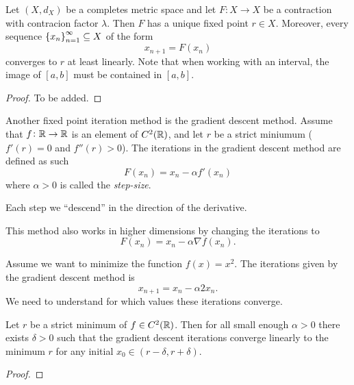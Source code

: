 \documentclass[11pt,a4paper]{article}
\begin{document}
\begin{theorem}
  Let $(X,d_X)$ be a completes metric space and
  let $F \colon X \to X$ be a contraction with contracion factor $\lambda$.
  Then $F$ has a unique fixed point $r \in X$.
  Moreover, every sequence $\left\{x_n\right\}_{n=1}^{\infty} \subseteq X$ of the
  form
  \[
    x_{n+1} = F(x_n)
  \]
  converges to $r$ at least linearly.
  Note that when working with an interval, the image of $[a,b]$ must
  be contained in $[a,b]$.
\end{theorem}
\begin{proof}
  To be added.
\end{proof}


\begin{example}
  Another fixed point iteration method is the gradient descent method.
  Assume that $f \colon \mathbb{R} \to \mathbb{R}$ is an element of $C^2(\mathbb{R})$,
  and let $r$ be a strict miniumum ($f'(r) = 0$ and $f''(r) > 0$).
  The iterations in the gradient descent method are defined as such
  \[
    F(x_n) = x_n - \alpha f'(x_n)
  \]
  where $\alpha > 0$ is called the \textit{step-size}.
\end{example}
\begin{remark}
  Each step we ``descend'' in the direction of the derivative.
\end{remark}
\begin{remark}
  This method also works in higher dimensions by changing the iterations
  to
  \[
    F(x_n) = x_n - \alpha \nabla f(x_n).
  \]
\end{remark}

\begin{example}
  Assume we want to minimize the function $f(x) = x^2$.
  The iterations given by the gradient descent method is
  \[
    x_{n+1} = x_n - \alpha 2 x_n.
  \]
  We need to understand for which values these iterations converge.
\end{example}

\begin{proposition}
  Let $r$ be a strict minimum of $f \in C^2(\mathbb{R})$.
  Then for all small enough $\alpha > 0$ there exists $\delta > 0$
  such that the gradient descent iterations converge linearly to the minimum
  $r$ for any initial $x_0 \in (r - \delta, r + \delta)$.
\end{proposition}
\begin{proof}
\end{proof}
\end{document}
